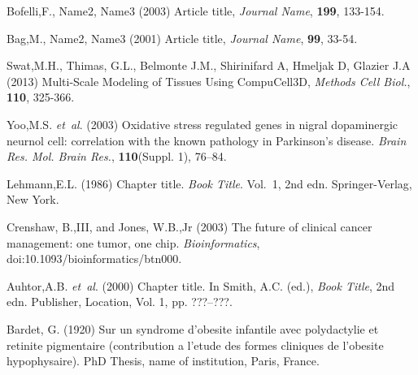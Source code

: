 \documentclass{bioinfo}
\begin{document}
\begin{thebibliography}{}
 Bofelli,F., Name2, Name3 (2003) Article title, {\it Journal Name}, {\bf 199}, 133-154.

 Bag,M., Name2, Name3 (2001) Article title, {\it Journal Name}, {\bf 99}, 33-54.

 Swat,M.H., Thimas, G.L., Belmonte J.M., Shirinifard A, Hmeljak D, Glazier J.A (2013) Multi-Scale Modeling of Tissues Using CompuCell3D, {\it Methods Cell Biol.}, {\bf 110}, 325-366.

Yoo,M.S. \textit{et~al}. (2003) Oxidative stress regulated genes
in nigral dopaminergic neurnol cell: correlation with the known
pathology in Parkinson's disease. \textit{Brain Res. Mol. Brain
Res.}, \textbf{110}(Suppl. 1), 76--84.

Lehmann,E.L. (1986) Chapter title. \textit{Book Title}. Vol.~1, 2nd edn. Springer-Verlag, New York.

Crenshaw, B.,III, and Jones, W.B.,Jr (2003) The future of clinical
cancer management: one tumor, one chip. \textit{Bioinformatics},
doi:10.1093/bioinformatics/btn000.

Auhtor,A.B. \textit{et~al}. (2000) Chapter title. In Smith, A.C.
(ed.), \textit{Book Title}, 2nd edn. Publisher, Location, Vol. 1, pp.
???--???.

Bardet, G. (1920) Sur un syndrome d'obesite infantile avec
polydactylie et retinite pigmentaire (contribution a l'etude des
formes cliniques de l'obesite hypophysaire). PhD Thesis, name of
institution, Paris, France.

\end{thebibliography}
\end{document}
